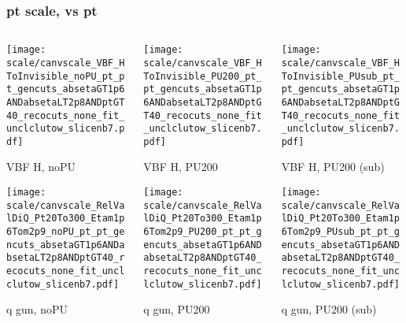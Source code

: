 \documentclass[8pt]{beamer}
\begin{document}
 \begin{frame}
  \frametitle{pt scale, vs pt}
  
  \begin{columns}
   \begin{column}{0.35\textwidth}
     \texttt{[image: scale/canvscale\_VBF\_HToInvisible\_noPU\_pt\_pt\_gencuts\_absetaGT1p6ANDabsetaLT2p8ANDptGT40\_recocuts\_none\_fit\_unclclutow\_slicenb7.pdf]}
     
     VBF H, noPU
    
     \texttt{[image: scale/canvscale\_RelValDiQ\_Pt20To300\_Etam1p6Tom2p9\_noPU\_pt\_pt\_gencuts\_absetaGT1p6ANDabsetaLT2p8ANDptGT40\_recocuts\_none\_fit\_unclclutow\_slicenb7.pdf]}
     
     q gun, noPU
   \end{column}
   \begin{column}{0.35\textwidth}
     \texttt{[image: scale/canvscale\_VBF\_HToInvisible\_PU200\_pt\_pt\_gencuts\_absetaGT1p6ANDabsetaLT2p8ANDptGT40\_recocuts\_none\_fit\_unclclutow\_slicenb7.pdf]}
     
     VBF H, PU200
    
     \texttt{[image: scale/canvscale\_RelValDiQ\_Pt20To300\_Etam1p6Tom2p9\_PU200\_pt\_pt\_gencuts\_absetaGT1p6ANDabsetaLT2p8ANDptGT40\_recocuts\_none\_fit\_unclclutow\_slicenb7.pdf]}
     
     q gun, PU200
   \end{column}
   \begin{column}{0.35\textwidth}
     \texttt{[image: scale/canvscale\_VBF\_HToInvisible\_PUsub\_pt\_pt\_gencuts\_absetaGT1p6ANDabsetaLT2p8ANDptGT40\_recocuts\_none\_fit\_unclclutow\_slicenb7.pdf]}
     
     VBF H, PU200 (sub)
    
     \texttt{[image: scale/canvscale\_RelValDiQ\_Pt20To300\_Etam1p6Tom2p9\_PUsub\_pt\_pt\_gencuts\_absetaGT1p6ANDabsetaLT2p8ANDptGT40\_recocuts\_none\_fit\_unclclutow\_slicenb7.pdf]}
     
     q gun, PU200 (sub)
   \end{column}
  \end{columns}
 \end{frame}
 
\end{document}
